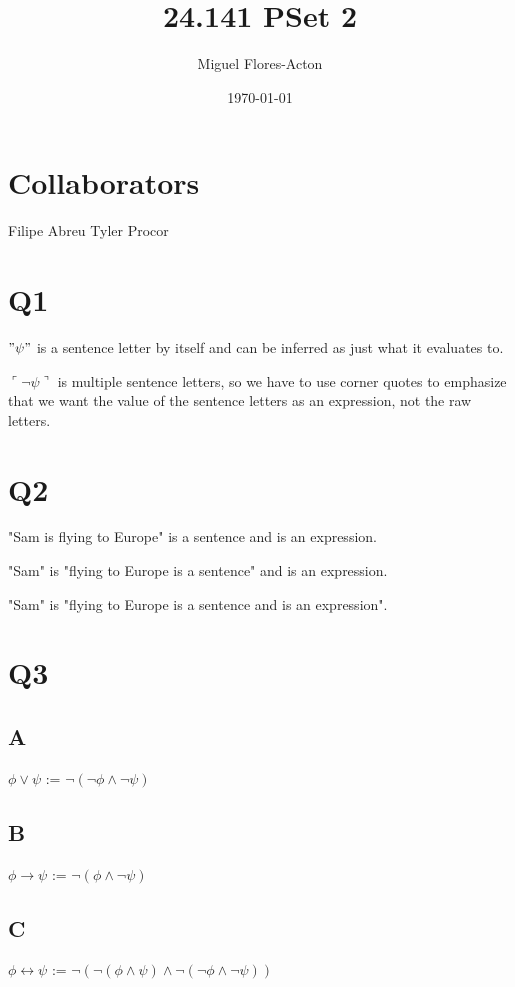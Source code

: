 \documentclass{article}
\begin{document}
\title{24.141 PSet 2}
\author{Miguel Flores-Acton}
\date{\today}
\maketitle

\section*{Collaborators}
Filipe Abreu
\newline
Tyler Procor

\section*{Q1}
\noindent $"\psi"$ is a sentence letter by itself and can be inferred as just what it
evaluates to.

\noindent $\ulcorner\lnot \psi\urcorner$ is multiple sentence letters, so we have to use corner quotes
to emphasize that we want the value of the sentence letters as an expression, not the raw letters. 

\section*{Q2}
\noindent "Sam is flying to Europe" is a sentence and is an expression.

\noindent "Sam" is "flying to Europe is a sentence" and is an expression.

\noindent "Sam" is "flying to Europe is a sentence and is an expression".

\section*{Q3}
\subsection*{A}
\noindent $\phi \lor \psi$ := $\neg(\neg \phi \land \neg \psi)$
\subsection*{B}
\noindent $\phi \rightarrow \psi$ := $\neg (\phi \land \neg \psi)$
\subsection*{C}
\noindent $\phi \leftrightarrow \psi$ := $\neg(\neg (\phi \land \psi) \land \neg (\neg \phi \land \neg \psi))$
\end{document}
